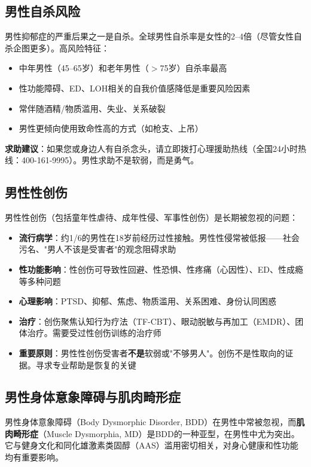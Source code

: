 \subsection{男性自杀风险}

男性抑郁症的严重后果之一是自杀。全球男性自杀率是女性的2--4倍（尽管女性自杀企图更多）。高风险特征：

\begin{itemize}[leftmargin=2cm]
	\item 中年男性（45--65岁）和老年男性（$>$75岁）自杀率最高
	\item 性功能障碍、ED、LOH相关的自我价值感降低是重要风险因素
	\item 常伴随酒精/物质滥用、失业、关系破裂
	\item 男性更倾向使用致命性高的方式（如枪支、上吊）
\end{itemize}

\textbf{求助建议}：如果您或身边人有自杀念头，请立即拨打心理援助热线（全国24小时热线：400-161-9995）。男性求助不是软弱，而是勇气。

\subsection{男性性创伤}

男性性创伤（包括童年性虐待、成年性侵、军事性创伤）是长期被忽视的问题：

\begin{itemize}[leftmargin=2cm]
	\item \textbf{流行病学}：约1/6的男性在18岁前经历过性接触。男性性侵常被低报——社会污名、"男人不该是受害者"的观念阻碍求助
	\item \textbf{性功能影响}：性创伤可导致性回避、性恐惧、性疼痛（心因性）、ED、性成瘾等多种问题
	\item \textbf{心理影响}：PTSD、抑郁、焦虑、物质滥用、关系困难、身份认同困惑
	\item \textbf{治疗}：创伤聚焦认知行为疗法（TF-CBT）、眼动脱敏与再加工（EMDR）、团体治疗。需要受过性创伤训练的治疗师
	\item \textbf{重要原则}：男性性创伤受害者\textbf{不是}软弱或"不够男人"。创伤不是性取向的证据。寻求专业帮助是恢复的关键
\end{itemize}

\subsection{男性身体意象障碍与肌肉畸形症}
\label{subsec:muscle_dysmorphia}

男性身体意象障碍（Body Dysmorphic Disorder, BDD）在男性中常被忽视，而\textbf{肌肉畸形症}（Muscle Dysmorphia, MD）是BDD的一种亚型，在男性中尤为突出。它与健身文化和同化雄激素类固醇（AAS）滥用密切相关，对身心健康和性功能均有重要影响。


